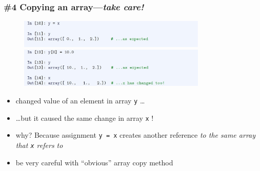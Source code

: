 \documentclass[english,14pt]{beamer}
\newcommand\red[1]{{\color{red} #1}}
\begin{document}

\begin{frame}[fragile]

\frametitle{\#4 Copying an array---\emph{take care!}}

\begin{figure}[ht]
	\centering
	\includegraphics[width=0.8\textwidth]{figures/LLp50a}
	\includegraphics[width=0.8\textwidth]{figures/LLp51b}
\end{figure}

\vspace*{-5mm}

\begin{itemize}
	\item changed value of an element in array \texttt{y} \ldots
	\item[] \ldots but it caused the same change in array \texttt{x} !
	
	\item why? Because assignment \texttt{y = x} creates another reference \emph{to the same array that \texttt{x} refers to}
	\item \red{be very careful} with ``obvious'' array copy method

\end{itemize}

\end{frame}

\end{document}

